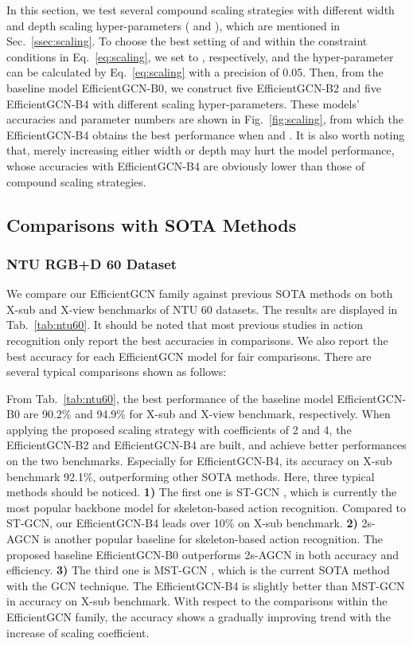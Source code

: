 \documentclass[10pt,journal,compsoc]{IEEEtran}
\begin{document}
In this section, we test several compound scaling strategies with different width and depth scaling hyper-parameters ( and ), which are mentioned in Sec.~\ref{ssec:scaling}. To choose the best setting of  and  within the constraint conditions in Eq.~\ref{eq:scaling}, we set  to , respectively, and the hyper-parameter  can be calculated by Eq.~\ref{eq:scaling} with a precision of 0.05. Then, from the baseline model EfficientGCN-B0, we construct five EfficientGCN-B2 and five EfficientGCN-B4 with different scaling hyper-parameters. These models' accuracies and parameter numbers are shown in Fig.~\ref{fig:scaling}, from which the EfficientGCN-B4 obtains the best performance when  and . It is also worth noting that, merely increasing either width or depth may hurt the model performance, whose accuracies with EfficientGCN-B4 are obviously lower than those of compound scaling strategies.

\subsection{Comparisons with SOTA Methods}
\label{ssec:comparisons}

\subsubsection{NTU RGB+D 60 Dataset}
\label{sssec:ntu60}

We compare our EfficientGCN family against previous SOTA methods on both X-sub and X-view benchmarks of NTU 60 datasets. The results are displayed in Tab.~\ref{tab:ntu60}. It should be noted that most previous studies in action recognition only report the best accuracies in comparisons. We also report the best accuracy for each EfficientGCN model for fair comparisons. There are several typical comparisons shown as follows:

From Tab.~\ref{tab:ntu60}, the best performance of the baseline model EfficientGCN-B0 are 90.2\% and 94.9\% for X-sub and X-view benchmark, respectively. When applying the proposed scaling strategy with coefficients of 2 and 4, the EfficientGCN-B2 and EfficientGCN-B4 are built, and achieve better performances on the two benchmarks. Especially for EfficientGCN-B4, its accuracy on X-sub benchmark 92.1\%, outperforming other SOTA methods. Here, three typical methods should be noticed. {\bf 1)} The first one is ST-GCN \cite{yan2018spatial}, which is currently the most popular backbone model for skeleton-based action recognition. Compared to ST-GCN, our EfficientGCN-B4 leads over 10\% on X-sub benchmark. {\bf 2)} 2s-AGCN \cite{shi2019two} is another popular baseline for skeleton-based action recognition. The proposed baseline EfficientGCN-B0 outperforms 2s-AGCN in both accuracy and efficiency. {\bf 3)} The third one is MST-GCN \cite{chen2021multi}, which is the current SOTA method with the GCN technique. The EfficientGCN-B4 is slightly better than MST-GCN in accuracy on X-sub benchmark. With respect to the comparisons within the EfficientGCN family, the accuracy shows a gradually improving trend with the increase of scaling coefficient.
\end{document}
